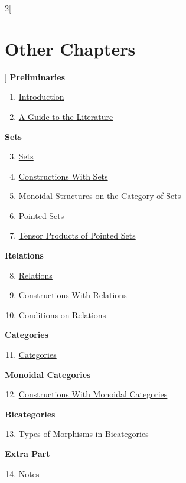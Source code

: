 \begin{multicols}{2}[\section{Other Chapters}]
\noindent
\textbf{Preliminaries}
\begin{enumerate}
\item \hyperref[introduction:section-phantom]{Introduction}
\item \hyperref[a-guide-to-the-literature:section-phantom]{A Guide to the Literature}
\end{enumerate}
\textbf{Sets}
\begin{enumerate}
\setcounter{enumi}{2}
\item \hyperref[sets:section-phantom]{Sets}
\item \hyperref[constructions-with-sets:section-phantom]{Constructions With Sets}
\item \hyperref[monoidal-structures-on-the-category-of-sets:section-phantom]{Monoidal Structures on the Category of Sets}
\item \hyperref[pointed-sets:section-phantom]{Pointed Sets}
\item \hyperref[tensor-products-of-pointed-sets:section-phantom]{Tensor Products of Pointed Sets}
\end{enumerate}
\textbf{Relations}
\begin{enumerate}
\setcounter{enumi}{7}
\item \hyperref[relations:section-phantom]{Relations}
\item \hyperref[constructions-with-relations:section-phantom]{Constructions With Relations}
\item \hyperref[conditions-on-relations:section-phantom]{Conditions on Relations}
\end{enumerate}
\textbf{Categories}
\begin{enumerate}
\setcounter{enumi}{10}
\item \hyperref[categories:section-phantom]{Categories}
\end{enumerate}
\textbf{Monoidal Categories}
\begin{enumerate}
\setcounter{enumi}{11}
\item \hyperref[constructions-with-monoidal-categories:section-phantom]{Constructions With Monoidal Categories}
\end{enumerate}
\textbf{Bicategories}
\begin{enumerate}
\setcounter{enumi}{12}
\item \hyperref[types-of-morphisms-in-bicategories:section-phantom]{Types of Morphisms in Bicategories}
\end{enumerate}
\textbf{Extra Part}
\begin{enumerate}
\setcounter{enumi}{13}
\item \hyperref[notes:section-phantom]{Notes}
\end{enumerate}
\end{multicols}

